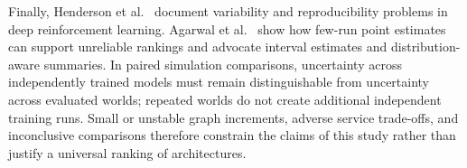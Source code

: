 Finally, Henderson et al.~\cite{Henderson2018DRLMatters} document variability and reproducibility problems in deep reinforcement learning. Agarwal et al.~\cite{Agarwal2021RLiable} show how few-run point estimates can support unreliable rankings and advocate interval estimates and distribution-aware summaries. In paired simulation comparisons, uncertainty across independently trained models must remain distinguishable from uncertainty across evaluated worlds; repeated worlds do not create additional independent training runs. Small or unstable graph increments, adverse service trade-offs, and inconclusive comparisons therefore constrain the claims of this study rather than justify a universal ranking of architectures.

